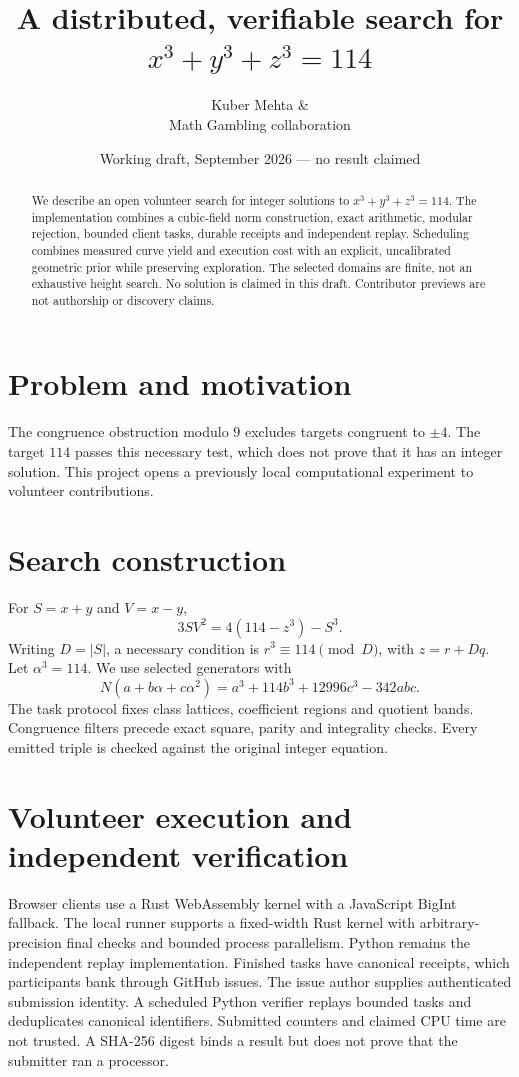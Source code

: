 \documentclass[11pt,a4paper]{article}
\title{A distributed, verifiable search for $x^3+y^3+z^3=114$}
\author{Kuber Mehta \& \contributorpreview\\Math Gambling collaboration}
\date{Working draft, September 2026 --- no result claimed}
\begin{document}
\maketitle
\begin{abstract}
We describe an open volunteer search for integer solutions to $x^3+y^3+z^3=114$. The implementation combines a cubic-field norm construction, exact arithmetic, modular rejection, bounded client tasks, durable receipts and independent replay. Scheduling combines measured curve yield and execution cost with an explicit, uncalibrated geometric prior while preserving exploration. The selected domains are finite, not an exhaustive height search. No solution is claimed in this draft. Contributor previews are not authorship or discovery claims.
\end{abstract}
\section{Problem and motivation}
The congruence obstruction modulo $9$ excludes targets congruent to $\pm4$. The target $114$ passes this necessary test, which does not prove that it has an integer solution. This project opens a previously local computational experiment to volunteer contributions.
\section{Search construction}
For $S=x+y$ and $V=x-y$,
\begin{equation}3SV^2=4(114-z^3)-S^3.\end{equation}
Writing $D=|S|$, a necessary condition is $r^3\equiv114\pmod D$, with $z=r+Dq$. Let $\alpha^3=114$. We use selected generators with
\begin{equation}N(a+b\alpha+c\alpha^2)=a^3+114b^3+12996c^3-342abc.\end{equation}
The task protocol fixes class lattices, coefficient regions and quotient bands. Congruence filters precede exact square, parity and integrality checks. Every emitted triple is checked against the original integer equation.
\section{Volunteer execution and independent verification}
Browser clients use a Rust WebAssembly kernel with a JavaScript BigInt fallback. The local runner supports a fixed-width Rust kernel with arbitrary-precision final checks and bounded process parallelism. Python remains the independent replay implementation. Finished tasks have canonical receipts, which participants bank through GitHub issues. The issue author supplies authenticated submission identity. A scheduled Python verifier replays bounded tasks and deduplicates canonical identifiers. Submitted counters and claimed CPU time are not trusted. A SHA-256 digest binds a result but does not prove that the submitter ran a processor.
\end{document}
